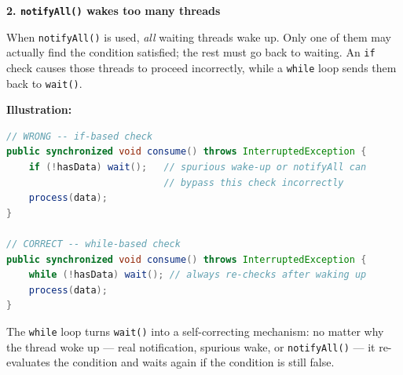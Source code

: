 \documentclass[12pt,a3paper]{article}
\begin{document}
\begin{enumerate}
\begin{tcolorbox}
\medskip
\textbf{2. \texttt{notifyAll()} wakes too many threads}

When \texttt{notifyAll()} is used, \emph{all} waiting threads wake
up.  Only one of them may actually find the condition satisfied; the
rest must go back to waiting.  An \texttt{if} check causes those
threads to proceed incorrectly, while a \texttt{while} loop sends
them back to \texttt{wait()}.

\medskip
\textbf{Illustration:}

\begin{lstlisting}[language=Java]
// WRONG -- if-based check
public synchronized void consume() throws InterruptedException {
    if (!hasData) wait();   // spurious wake-up or notifyAll can
                            // bypass this check incorrectly
    process(data);
}

// CORRECT -- while-based check
public synchronized void consume() throws InterruptedException {
    while (!hasData) wait(); // always re-checks after waking up
    process(data);
}
\end{lstlisting}

The \texttt{while} loop turns \texttt{wait()} into a self-correcting
mechanism: no matter why the thread woke up --- real notification,
spurious wake, or \texttt{notifyAll()} --- it re-evaluates the
condition and waits again if the condition is still false.

\end{tcolorbox}


\end{enumerate}
\end{document}
